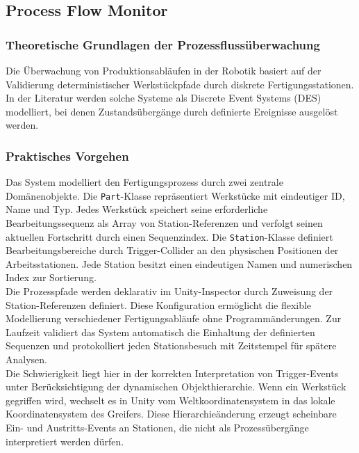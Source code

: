 \subsection{Process Flow Monitor}
\label{section:prozessfolgen}
\subsubsection{Theoretische Grundlagen der Prozessflussüberwachung}
\noindent
Die Überwachung von Produktionsabläufen in der Robotik basiert auf der Validierung
deterministischer Werkstückpfade durch diskrete Fertigungsstationen. In der
Literatur werden solche Systeme als Discrete Event Systems (DES) modelliert, bei
denen Zustandsübergänge durch definierte Ereignisse ausgelöst werden.

\subsubsection{Praktisches Vorgehen}
\noindent
Das System modelliert den Fertigungsprozess durch zwei zentrale Domänenobjekte.
Die \texttt{Part}-Klasse repräsentiert Werkstücke mit eindeutiger ID, Name und
Typ. Jedes Werkstück speichert seine erforderliche Bearbeitungssequenz als
Array von Station-Referenzen und verfolgt seinen aktuellen Fortschritt durch
einen Sequenzindex. Die \texttt{Station}-Klasse definiert Bearbeitungsbereiche
durch Trigger-Collider an den physischen Positionen der Arbeitsstationen. Jede
Station besitzt einen eindeutigen Namen und numerischen Index zur Sortierung.\\

\noindent
Die Prozesspfade werden deklarativ im Unity-Inspector durch Zuweisung der
Station-Referenzen definiert. Diese Konfiguration ermöglicht die flexible
Modellierung verschiedener Fertigungsabläufe ohne Programmänderungen. Zur
Laufzeit validiert das System automatisch die Einhaltung der definierten
Sequenzen und protokolliert jeden Stationsbesuch mit Zeitstempel für spätere
Analysen.\\

\noindent
Die Schwierigkeit liegt hier in der korrekten Interpretation von
Trigger-Events unter Berücksichtigung der dynamischen Objekthierarchie. Wenn ein
Werkstück gegriffen wird, wechselt es in Unity vom Weltkoordinatensystem in das
lokale Koordinatensystem des Greifers. Diese Hierarchieänderung erzeugt
scheinbare Ein- und Austritts-Events an Stationen, die nicht als
Prozessübergänge interpretiert werden dürfen.\\

